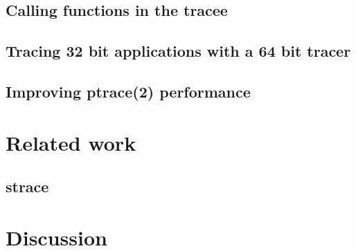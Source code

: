 \documentclass[a4paper, 10pt]{report}
\begin{document}
\section{Calling functions in the tracee}

\section{Tracing 32 bit applications with a 64 bit tracer}

\section{Improving ptrace(2) performance}
\label{ptrace-perf}



\chapter{Related work}

\section{strace}



\chapter{Discussion}




\pagebreak
\end{document}
